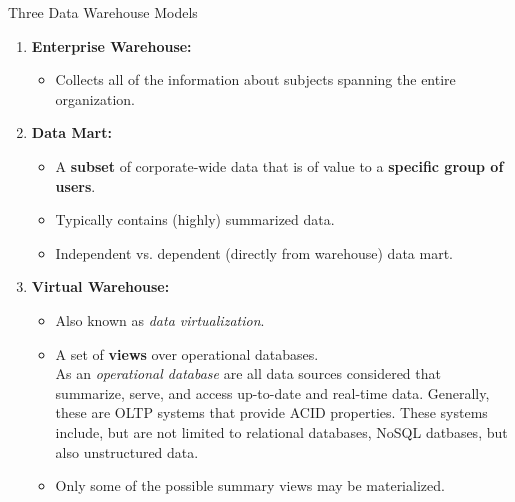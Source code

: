 \begin{frame}{Three Data Warehouse Models}
	\begin{enumerate}
		\item \textbf{\color{airforceblue}Enterprise Warehouse:}
		      \begin{itemize}
			      \item Collects all of the information about subjects spanning the entire organization.
		      \end{itemize}
		\item \textbf{\color{airforceblue}Data Mart:}
		      \begin{itemize}
			      \item A \textbf{\color{airforceblue}subset} of corporate-wide data that is of value to a \textbf{\color{airforceblue}specific group of users}.
			      \item Typically contains (highly) summarized data.
			      \item Independent vs. dependent (directly from warehouse) data mart.
		      \end{itemize}
		\item \textbf{\color{airforceblue}Virtual Warehouse:}
		      \begin{itemize}
			      \item Also known as \textit{data virtualization}.
			      \item A set of \textbf{\color{airforceblue}views} over operational databases.\\
			            {\scriptsize As an \textit{operational database} are all data sources considered that summarize, serve, and access up-to-date and real-time data. Generally, these are OLTP systems that provide ACID properties. These systems include, but are not limited to relational databases, NoSQL datbases, but also unstructured data.}
			      \item Only some of the possible summary views may be materialized.
		      \end{itemize}
	\end{enumerate}
\end{frame}

